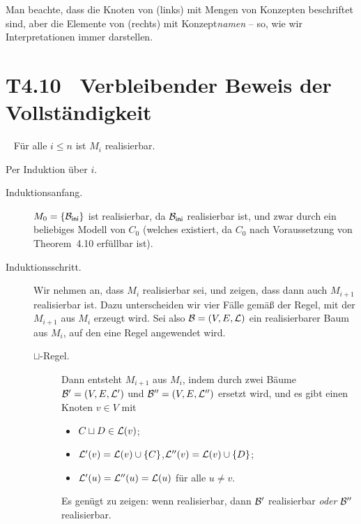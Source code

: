 \documentclass[fontsize=11pt, twoside=false, numbers=autoenddot]{scrbook}
\begin{document}
%
Man beachte, dass die Knoten von \Bmc (links) mit Mengen von Konzepten beschriftet sind,
aber die Elemente von \Imc (rechts) mit Konzept\emph{namen} -- so, wie wir Interpretationen
immer darstellen.

\section*{T4.10~ Verbleibender Beweis der Vollständigkeit}

~
Für alle $i \leq n$ ist $M_i$ realisierbar.

\begin{beweis}
  Per Induktion über $i$.
  \begin{description}
    \item[Induktionsanfang.]
      $M_0 = \{\mathcal{B}_{\textsf{ini}}\}$ ist realisierbar,
      da $\mathcal{B}_{\textsf{ini}}$ realisierbar ist,
      und zwar durch ein beliebiges Modell von $C_0$
      (welches existiert, da $C_0$ nach Voraussetzung von Theorem~4.10 erfüllbar ist).
    \item[Induktionsschritt.]
      Wir nehmen an, dass $M_i$ realisierbar sei,
      und zeigen, dass dann auch $M_{i+1}$ realisierbar ist.
      Dazu unterscheiden wir vier Fälle gemäß der Regel,
      mit der $M_{i+1}$ aus $M_i$ erzeugt wird.
      Sei also $\mathcal{B}=(V,E,\mathcal{L})$ ein realisierbarer Baum aus $M_i$,
      auf den eine Regel angewendet wird.
      \begin{description}
        \item[{\boldmath $\sqcup$-Regel.}]
          Dann entsteht $M_{i+1}$ aus $M_i$,
          indem \Bmc durch zwei Bäume $\mathcal{B}' = (V,E,\mathcal{L}')$ und $\mathcal{B}'' = (V,E,\mathcal{L}'')$
          ersetzt wird,
          und es gibt einen Knoten $v \in V$ mit
          \begin{itemize}
            \item
              $C \sqcup D \in \mathcal{L}(v)$;
            \item
              $\mathcal{L}'(v) = \mathcal{L}(v) \cup \{C\}$,\quad $\mathcal{L}''(v) = \mathcal{L}(v) \cup \{D\}$;
            \item
              $\mathcal{L}'(u) = \mathcal{L}''(u) = \mathcal{L}(u)$ für alle $u \neq v$.
          \end{itemize}
          Es genügt zu zeigen: wenn \Bmc realisierbar, dann $\mathcal{B}'$ realisierbar
          \emph{oder} $\mathcal{B}''$ realisierbar.
          

\end{description}
\end{description}
\end{beweis}
\end{document}

